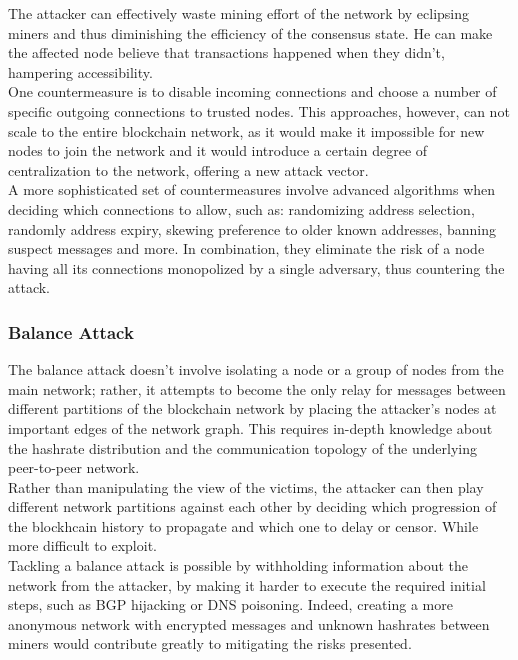 \documentclass[11pt,a4paper]{article}
\begin{document}
The attacker can effectively waste mining effort of the network by eclipsing miners and thus diminishing the efficiency of the consensus state. He can make the affected node believe that transactions happened when they didn't, hampering accessibility.\\

One countermeasure is to disable incoming connections and choose a number of specific outgoing connections to trusted nodes. This approaches, however, can not scale to the entire blockchain network, as it would make it impossible for new nodes to join the network and it would introduce a certain degree of centralization to the network, offering a new attack vector.\\

A more sophisticated set of countermeasures involve advanced algorithms when deciding which connections to allow, such as: randomizing address selection, randomly address expiry, skewing preference to older known addresses, banning suspect messages and more. In combination, they eliminate the risk of a node having all its connections monopolized by a single adversary, thus countering the attack.\\

\subsubsection{Balance Attack}

The balance attack doesn't involve isolating a node or a group of nodes from the main network; rather, it attempts to become the only relay for messages between different partitions of the blockchain network by placing the attacker's nodes at important edges of the network graph. This requires in-depth knowledge about the hashrate distribution and the communication topology of the underlying peer-to-peer network.\\

Rather than manipulating the view of the victims, the attacker can then play different network partitions against each other by deciding which progression of the blockhcain history to propagate and which one to delay or censor. While more difficult to exploit.\\

Tackling a balance attack is possible by withholding information about the network from the attacker, by making it harder to execute the required initial steps, such as BGP hijacking or DNS poisoning. Indeed, creating a more anonymous network with encrypted messages and unknown hashrates between miners would contribute greatly to mitigating the risks presented.\\
\end{document}
